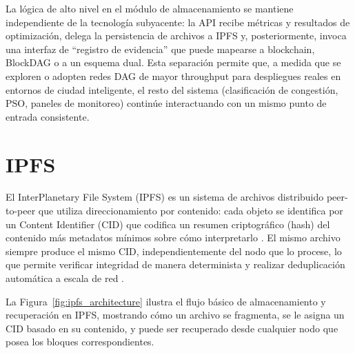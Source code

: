La lógica de alto nivel en el módulo de almacenamiento se mantiene independiente de la tecnología subyacente: la API recibe métricas y resultados de optimización, delega la persistencia de archivos a IPFS y, posteriormente, invoca una interfaz de ``registro de evidencia'' que puede mapearse a blockchain, BlockDAG o a un esquema dual. Esta separación permite que, a medida que se exploren o adopten redes DAG de mayor throughput para despliegues reales en entornos de ciudad inteligente, el resto del sistema (clasificación de congestión, PSO, paneles de monitoreo) continúe interactuando con un mismo punto de entrada consistente.

\section{IPFS}
\label{subsec:ipfs_traffic_storage}

El InterPlanetary File System (IPFS) es un sistema de archivos distribuido peer-to-peer que utiliza direccionamiento por contenido: cada objeto se identifica por un Content Identifier (CID) que codifica un resumen criptográfico (hash) del contenido más metadatos mínimos sobre cómo interpretarlo \cite{benet2014ipfs}. El mismo archivo siempre produce el mismo CID, independientemente del nodo que lo procese, lo que permite verificar integridad de manera determinista y realizar deduplicación automática a escala de red \cite{ipfs_architecture}.

La Figura~\ref{fig:ipfs_architecture} ilustra el flujo básico de almacenamiento y recuperación en IPFS, mostrando cómo un archivo se fragmenta, se le asigna un CID basado en su contenido, y puede ser recuperado desde cualquier nodo que posea los bloques correspondientes.

